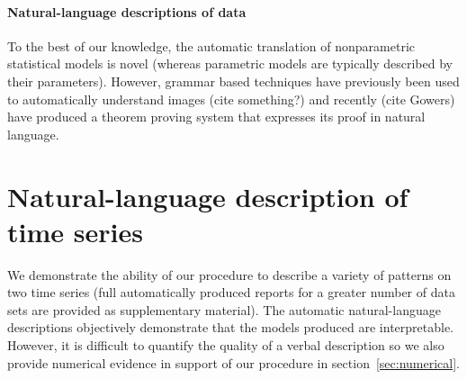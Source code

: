\documentclass{article}
\begin{document}
\paragraph{Natural-language descriptions of data}

To the best of our knowledge, the automatic translation of nonparametric statistical models is novel (whereas parametric models are typically described by their parameters).
However, grammar based techniques have previously been used to automatically understand images (cite something?) and recently (cite Gowers) have produced a theorem proving system that expresses its proof in natural language.

\section{Natural-language description of time series}
\label{sec:examples}
We demonstrate the ability of our procedure to describe a variety of patterns on two time series (full automatically produced reports for a greater number of data sets are provided as supplementary material).
The automatic natural-language descriptions objectively demonstrate that the models produced are interpretable.
However, it is difficult to quantify the quality of a verbal description so we also provide numerical evidence in support of our procedure in section~\ref{sec:numerical}.
\end{document}
